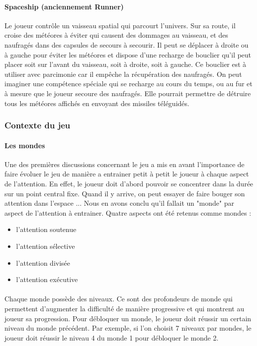 \paragraph{Spaceship (anciennement Runner)}Le joueur contrôle un vaisseau spatial qui parcourt l'univers. Sur sa route, il croise des météores à éviter qui causent des dommages au
vaisseau, et des naufragés dans des capsules de secours à secourir. Il peut se déplacer à droite ou à gauche pour éviter les météores et dispose d'une recharge de bouclier qu'il peut
placer soit sur l'avant du vaisseau, soit à droite, soit à gauche. Ce bouclier est à utiliser avec parcimonie car il empêche la récupération des naufragés. On peut imaginer une
compétence spéciale qui se recharge au cours du temps, ou au fur et à mesure que le joueur secoure des naufragés. Elle pourrait permettre de détruire tous les météores affichés en
envoyant des missiles téléguidés.


\newpage
\subsubsection{Contexte du jeu}

\paragraph{Les mondes}Une des premières discussions concernant le jeu a mis en avant l'importance de faire évoluer le jeu de manière a entrainer petit à petit le joueur à chaque aspect
de l'attention. En effet, le joueur doit d'abord pouvoir se concentrer dans la durée sur un point central fixe. Quand il y arrive, on peut essayer de faire bouger son attention dans
l'espace ... Nous en avons conclu qu'il fallait un "monde" par aspect de l'attention à entrainer. Quatre aspects ont été retenus comme mondes :
\begin{itemize}
\item l'attention soutenue
\item l'attention sélective
\item l'attention divisée
\item l'attention exécutive
\end{itemize}

\paragraph{}Chaque monde possède des niveaux. Ce sont des profondeurs de monde qui permettent d'augmenter la difficulté de manière progressive et qui montrent au joueur sa progression.
Pour débloquer un monde, le joueur doit réussir un certain niveau du monde précédent. Par exemple, si l'on choisit 7 niveaux par mondes, le joueur doit réussir le niveau 4 du monde 1
pour débloquer le monde 2.

